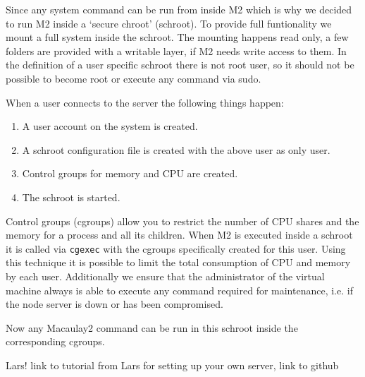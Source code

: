\documentclass[]{article}
\begin{document}
Since any system command can be run from inside M2 which is why we decided to run M2 inside a `secure chroot' (schroot). To provide full funtionality we mount a full system inside the schroot. The mounting happens read only, a few folders are provided with a writable layer, if M2 needs write access to them. In the definition of a user specific schroot there is not root user, so it should not be possible to become root or execute any command via sudo.

When a user connects to the server the following things happen:
\begin{enumerate}
\item A user account on the system is created.
\item A schroot configuration file is created with the above user as only user.
\item Control groups for memory and CPU are created.
\item The schroot is started.
\end{enumerate}

Control groups (cgroups) allow you to restrict the number of CPU shares and the memory for a process and all its children. When M2 is executed inside a schroot it is called via {\tt cgexec} with the cgroups specifically created for this user. Using this technique it is possible to limit the total consumption of CPU and memory by each user. Additionally we ensure that the administrator of the virtual machine always is able to execute any command required for maintenance, i.e. if the node server is down or has been compromised.

Now any Macaulay2 command can be run in this schroot inside the corresponding cgroups.

Lars!
link to tutorial from Lars for setting up your own server, link to github





\end{document}
